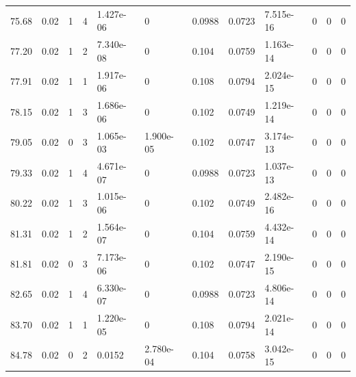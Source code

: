 \documentclass[preview]{standalone}
\begin{document}
{{{\begin{tabular}{L{1.2cm}C{1.2cm} C{0.3cm}C{0.5cm} C{1.4cm}C{1.4cm} C{1.4cm}C{1.4cm} C{1.6cm}C{1.6cm} C{1.6cm}C{1.6cm}}
  75.68  &  0.02  & 1     &  4 &  1.427e-06  & 0  &  0.0988&   0.0723& 7.515e-16 & 0   &  0 & 0  \\ 
  77.20  &  0.02  & 1     &  2 &  7.340e-08  & 0  &  0.104&   0.0759& 1.163e-14 & 0   &  0 & 0  \\ 
  77.91  &  0.02  & 1     &  1 &  1.917e-06  & 0  &  0.108&   0.0794& 2.024e-15 & 0   &  0 & 0  \\ 
  78.15  &  0.02  & 1     &  3 &  1.686e-06  & 0  &  0.102&   0.0749& 1.219e-14 & 0   &  0 & 0  \\ 
  79.05  &  0.02  & 0     &  3 &  1.065e-03  & 1.900e-05  &  0.102&   0.0747& 3.174e-13 & 0   &  0 & 0  \\ 
  79.33  &  0.02  & 1     &  4 &  4.671e-07  & 0  &  0.0988&   0.0723& 1.037e-13 & 0   &  0 & 0  \\ 
  80.22  &  0.02  & 1     &  3 &  1.015e-06  & 0  &  0.102&   0.0749& 2.482e-16 & 0   &  0 & 0  \\ 
  81.31  &  0.02  & 1     &  2 &  1.564e-07  & 0  &  0.104&   0.0759& 4.432e-14 & 0   &  0 & 0  \\ 
  81.81  &  0.02  & 0     &  3 &  7.173e-06  & 0  &  0.102&   0.0747& 2.190e-15 & 0   &  0 & 0  \\ 
  82.65  &  0.02  & 1     &  4 &  6.330e-07  & 0  &  0.0988&   0.0723& 4.806e-14 & 0   &  0 & 0  \\ 
  83.70  &  0.02  & 1     &  1 &  1.220e-05  & 0  &  0.108&   0.0794& 2.021e-14 & 0   &  0 & 0  \\ 
  84.78  &  0.02  & 0     &  2 &  0.0152  & 2.780e-04  &  0.104&   0.0758& 3.042e-15 & 0   &  0 & 0  \\ 
\hline 
\end{tabular} 

}}}
\end{document}
